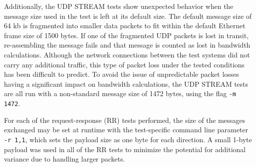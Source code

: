 Additionally, the UDP STREAM tests show unexpected behavior when the message size used in the test is left at its default size.  
The default message size of 64 kb is fragmented into smaller data packets to fit within the default Ethernet frame size of 1500 bytes.
If one of the fragmented UDP packets is lost in transit, re-assembling the message fails and that message is counted as lost in bandwidth calculations.
Although the network connections between the test systems did not carry any additional traffic, this type of packet loss under the tested conditions has been difficult to predict.
To avoid the issue of unpredictable packet losses having a significant impact on bandwidth calculations, the UDP STREAM tests are all run with a non-standard message size of 1472 bytes, using the flag \texttt{-m 1472}.  

For each of the request-response (RR) tests performed, the size of the messages exchanged may be set at runtime with the test-specific command line parameter \texttt{-r 1,1}, which sets the payload size as one byte for each direction.
A small 1-byte payload was used in all of the RR tests to minimize the potential for additional variance due to handling larger packets. 


\nocite{iperf3}
